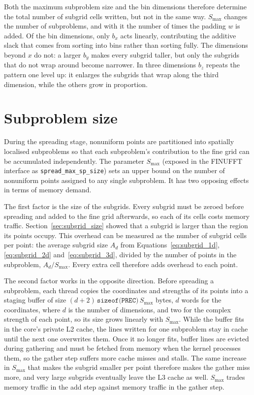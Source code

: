 Both the maximum subproblem size and the bin dimensions therefore determine the total number of subgrid cells written, but not in the same way. $S_{\max}$ changes the number of subproblems, and with it the number of times the padding $w$ is added. Of the bin dimensions, only $b_x$ acts linearly, contributing the additive slack that comes from sorting into bins rather than sorting fully. The dimensions beyond $x$ do not: a larger $b_y$ makes every subgrid taller, but only the subgrids that do not wrap around become narrower. In three dimensions $b_z$ repeats the pattern one level up: it enlarges the subgrids that wrap along the third dimension, while the others grow in proportion.
\section{Subproblem size}

During the spreading stage, nonuniform points are partitioned into spatially localised subproblems so that each subproblem's contribution to the fine grid can be accumulated independently. The parameter $S_{\max}$ (exposed in the FINUFFT interface as \texttt{spread\_max\_sp\_size}) sets an upper bound on the number of nonuniform points assigned to any single subproblem. It has two opposing effects in terms of memory demand.

The first factor is the size of the subgrids. Every subgrid must be zeroed before spreading and added to the fine grid afterwards, so each of its cells costs memory traffic. Section~\ref{sec:subgrid_size} showed that a subgrid is larger than the region its points occupy. This overhead can be measured as the number of subgrid cells per point: the average subgrid size $A_d$ from Equations~\eqref{eq:subgrid_1d}, \eqref{eq:subgrid_2d} and~\eqref{eq:subgrid_3d}, divided by the number of points in the subproblem, $A_d/S_{\max}$. Every extra cell therefore adds overhead to each point.

The second factor works in the opposite direction. Before spreading a subproblem, each thread copies the coordinates and strengths of its points into a staging buffer of size $(d+2)\,\texttt{sizeof(PREC)}\,S_{\max}$ bytes, $d$ words for the coordinates, where $d$ is the number of dimensions, and two for the complex strength of each point, so its size grows linearly with $S_{\max}$. While the buffer fits in the core's private L2 cache, the lines written for one subproblem stay in cache until the next one overwrites them. Once it no longer fits, buffer lines are evicted during gathering and must be fetched from memory when the kernel processes them, so the gather step suffers more cache misses and stalls. The same increase in $S_{\max}$ that makes the subgrid smaller per point therefore makes the gather miss more, and very large subgrids eventually leave the L3 cache as well. $S_{\max}$ trades memory traffic in the add step against memory traffic in the gather step.

